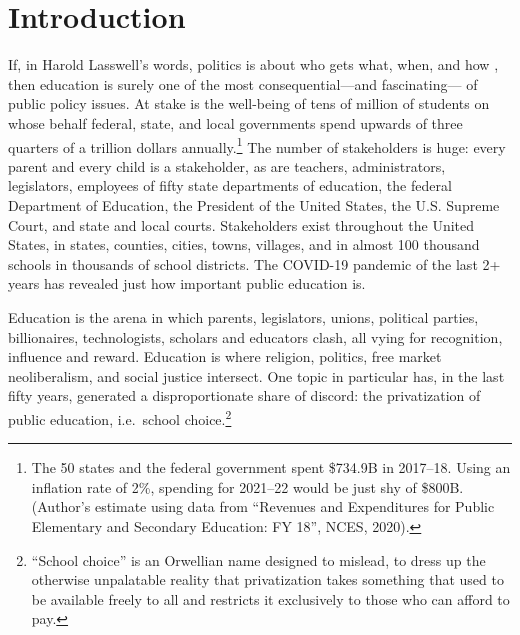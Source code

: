 
\chapter{Introduction}\label{ch:Introduction}

If, in Harold Lasswell's words, politics is about who gets what, when, and how \parencite{Lasswell1936}, then education is surely one of the most consequential—and fascinating— of public policy issues. At stake is the well-being of tens of million of students on whose behalf federal, state, and local governments spend upwards of three quarters of a trillion dollars annually.\footnote{The 50 states and the federal government spent \$734.9B in 2017–18. Using an inflation rate of 2\%, spending for 2021–22 would be just shy of \$800B. (Author's estimate using data from ``Revenues and Expenditures for Public Elementary and Secondary Education: FY 18'', NCES, 2020).} The number of stakeholders is huge: every parent and every child is a stakeholder, as are teachers, administrators, legislators, employees of fifty state departments of education, the federal Department of Education, the President of the United States, the U.S. Supreme Court, and state and local courts. Stakeholders exist throughout the United States, in states, counties, cities, towns, villages, and in almost 100 thousand schools in thousands of school districts. The COVID-19 pandemic of the last 2+ years has revealed just how important public education is.

Education is the arena in which parents, legislators, unions, political parties, billionaires, technologists, scholars and educators clash, all vying for recognition, influence and reward. Education is where religion, politics, free market neoliberalism, and social justice intersect. One topic in particular has, in the last fifty years, generated a disproportionate share of discord: the privatization of public education, i.e.~school choice.\footnote{``School choice'' is an Orwellian name designed to mislead, to dress up the otherwise unpalatable reality that privatization takes something that used to be available freely to all and restricts it exclusively to those who can afford to pay.}

